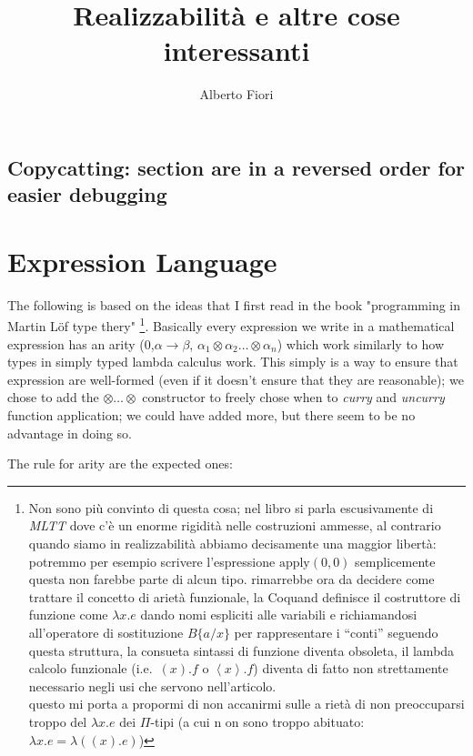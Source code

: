 \documentclass[11pt,a5paper,draft,oneside]{amsbook}
\author{Alberto Fiori}
\title{Realizzabilità e altre cose interessanti}
\newcommand{\uplaOp}[3]{(#1_{1}#3\dots#3#1_{#2})}
\newcommand{\xnContext}[3]
	{#2_1   \in #1_1 
						, \dots, 
	#2_{#3} \in #1_{#3}{\uplaOp{#2}{#3-1}{,}}}
\begin{document}
%

\section{Copycatting: section are in a reversed order for easier debugging}



\chapter{Expression Language}
	The following is based on the ideas that I first read in the book "programming in Martin Löf type thery" 
	\footnote{\label{qwe13}Non sono più convinto di questa cosa; nel libro si parla escusivamente di \emph{MLTT} dove c'è un enorme rigidità nelle costruzioni ammesse, al contrario quando siamo in realizzabilità abbiamo decisamente una maggior libertà: potremmo per esempio scrivere l'espressione $\text{apply}(0,0)$ semplicemente questa non farebbe parte di alcun tipo.
	rimarrebbe ora da decidere come trattare il concetto di arietà funzionale, la Coquand definisce il costruttore di funzione come $\lambda x . e$ dando nomi espliciti alle variabili e richiamandosi all'operatore di sostituzione $B\{a/x\}$ per rappresentare i ``conti'' seguendo questa struttura, la consueta sintassi di funzione diventa obsoleta, il lambda calcolo funzionale (i.e.\ $(x).f$ o $\left\langle x\right\rangle.f$) diventa di fatto non strettamente necessario negli usi che servono nell'articolo. \\ questo mi porta a propormi di non accanirmi sulle a
	rietà di non preoccuparsi troppo del $\lambda x.e$ dei $\Pi$-tipi (a cui n
	on sono troppo abituato: $\lambda x.e 
	= \lambda ((x).e)$) 
	}. 
	Basically every expression we write in a mathematical expression has an arity (0,$\alpha\rightarrow\beta$, $\alpha_1\otimes\alpha_2\ldots\otimes\alpha_n$) which work similarly to how types in simply typed lambda calculus work. 
	This simply is a way to ensure that expression are well-formed (even if it doesn't ensure that they are reasonable); we chose to add the $\otimes\ldots\otimes$ constructor to freely chose when to \emph{curry} and \emph{uncurry} function application; we could have added more, but there seem to be no advantage in doing so.
	
	The rule for arity are the expected ones:
	
\end{document}
